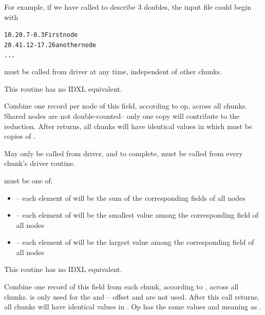 \documentclass[10pt]{article}
\begin{document}
     For example, if we have called  to describe 3 doubles,
     the input file could begin with

\begin{alltt}
          1    0.2    0.7    -0.3      First node
          2    0.4    1.12   -17.26    another node
          ...
\end{alltt}

      must be called from driver at any time, independent
     of other chunks. 
     
     This routine has no IDXL equivalent.


Combine one record per node of this field, according to op, across all chunks.
Shared nodes are not double-counted-- only one copy will contribute to the
reduction.  After  returns, all chunks will have identical
values in  which must be  copies of .

     May only be called from driver, and to complete, must be called
     from every chunk's driver routine.

      must be one of:

\begin{itemize}
        \item {}-- each element of  will be the sum 
of the corresponding fields of all nodes
        \item {}-- each element of  will be the 
smallest value among the corresponding field of all nodes
        \item {}-- each element of  will be the largest 
value among the corresponding field of all nodes
\end{itemize}

     This routine has no IDXL equivalent.



     Combine one record of this field from each chunk, acoording to , 
 across all chunks.
 is only used for the  and -- offset and
 are not used.  After this call returns, all chunks will have
identical values in .  Op has the same values and meaning as
.
\end{document}
